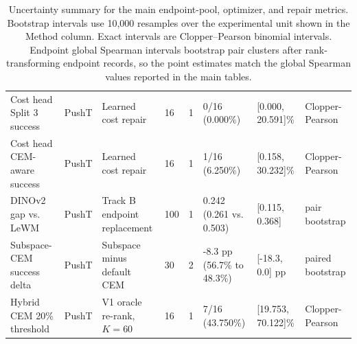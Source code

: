 \begin{table}[p]
{\begin{tabular}{@{}L{0.18\textwidth}L{0.07\textwidth}L{0.20\textwidth}L{0.05\textwidth}L{0.06\textwidth}L{0.15\textwidth}L{0.12\textwidth}L{0.15\textwidth}@{}}
\addlinespace
Cost head Split 3 success & PushT & Learned cost repair & 16 & 1 & 0/16 (0.000\%) & [0.000, 20.591]\% & Clopper-Pearson \\
Cost head CEM-aware success & PushT & Learned cost repair & 16 & 1 & 1/16 (6.250\%) & [0.158, 30.232]\% & Clopper-Pearson \\
DINOv2 gap vs. LeWM & PushT & Track B endpoint replacement & 100 & 1 & 0.242 (0.261 vs. 0.503) & [0.115, 0.368] & pair bootstrap \\
Subspace-CEM success delta & PushT & Subspace minus default CEM & 30 & 2 & -8.3 pp (56.7\% to 48.3\%) & [-18.3, 0.0] pp & paired bootstrap \\
Hybrid CEM 20\% threshold & PushT & V1 oracle re-rank, $K=60$ & 16 & 1 & 7/16 (43.750\%) & [19.753, 70.122]\% & Clopper-Pearson \\
\bottomrule
\end{tabular}%
}
\caption{Uncertainty summary for the main endpoint-pool, optimizer, and repair metrics. Bootstrap intervals use 10{,}000 resamples over the experimental unit shown in the Method column. Exact intervals are Clopper--Pearson binomial intervals. Endpoint global Spearman intervals bootstrap pair clusters after rank-transforming endpoint records, so the point estimates match the global Spearman values reported in the main tables.}
\label{tab:appendix-uncertainty}
\end{table}
